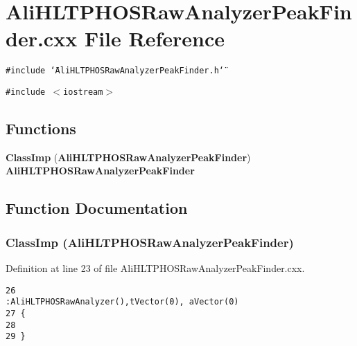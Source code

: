 \section{Ali\-HLTPHOSRaw\-Analyzer\-Peak\-Finder.cxx File Reference}
\label{AliHLTPHOSRawAnalyzerPeakFinder_8cxx}


{\tt \#include \char`\"{}Ali\-HLTPHOSRaw\-Analyzer\-Peak\-Finder.h\char`\"{}}\par
{\tt \#include $<$iostream$>$}\par
\subsection*{Functions}
\begin{CompactItemize}
\item 
{\bf Class\-Imp} ({\bf Ali\-HLTPHOSRaw\-Analyzer\-Peak\-Finder}) {\bf Ali\-HLTPHOSRaw\-Analyzer\-Peak\-Finder}
\end{CompactItemize}


\subsection{Function Documentation}
\subsubsection{\setlength{\rightskip}{0pt plus 5cm}Class\-Imp ({\bf Ali\-HLTPHOSRaw\-Analyzer\-Peak\-Finder})}\label{AliHLTPHOSRawAnalyzerPeakFinder_8cxx_a0}




Definition at line 23 of file Ali\-HLTPHOSRaw\-Analyzer\-Peak\-Finder.cxx.

\footnotesize\begin{verbatim}26                                                                                                       :AliHLTPHOSRawAnalyzer(),tVector(0), aVector(0)
27 {
28 
29 }
\end{verbatim}\normalsize 


